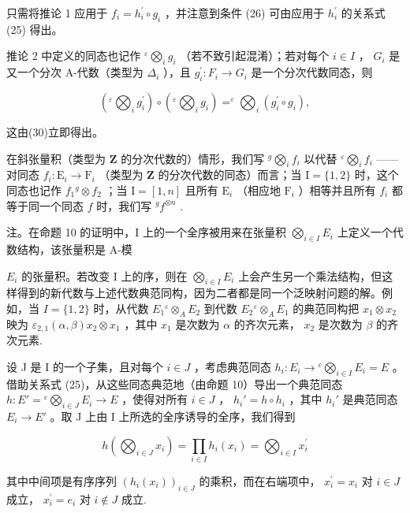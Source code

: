 只需将推论 1 应用于 \(f_{i} = h_{i}^{\prime} \circ g_{i}\) ，并注意到条件 (26) 可由应用于 \(h_{i}^{\prime}\) 的关系式 (25) 得出。

推论 2 中定义的同态也记作 \({}^{\varepsilon}\bigotimes_{i} g_{i}\) （若不致引起混淆）；若对每个 \(i \in I\) ， \(G_{i}\) 是又一个分次 A-代数（类型为 \(\Delta_{i}\) ），且 \(g_{i}^{\prime}: F_{i} \to G_{i}\) 是一个分次代数同态，则

\[
\left(^ {\varepsilon} \bigotimes_ {i} g _ {i} ^ {\prime}\right) \circ \left(^ {\varepsilon} \bigotimes_ {i} g _ {i}\right) = ^ {\varepsilon} \bigotimes_ {i} \left(g _ {i} ^ {\prime} \circ g _ {i}\right),\tag{31}
\]

这由(30)立即得出。

在斜张量积（类型为 \(\mathbf{Z}\) 的分次代数的）情形，我们写 \({}^{g}\bigotimes_{i}f_{i}\) 以代替 \({}^{\varepsilon}\bigotimes_{i}f_{i}\) ——对同态 \(f_{i}: \mathrm{E}_{i} \to \mathrm{F}_{i}\) （类型为 \(\mathbf{Z}\) 的分次代数的同态）而言；当 \(\mathrm{I} = \{1, 2\}\) 时，这个同态也记作 \(f_{1}{}^{g}\otimes f_{2}\) ；当 \(\mathrm{I} = [1, n]\) 且所有 \(\mathrm{E}_{i}\) （相应地 \(\mathrm{F}_{i}\) ）相等并且所有 \(f_{i}\) 都等于同一个同态 \(f\) 时，我们写 \({}^{g}f^{\otimes n}\) .

注。在命题 10 的证明中，I 上的一个全序被用来在张量积 \(\bigotimes_{i\in I}E_i\) 上定义一个代数结构，该张量积是 A-模

\(E_{i}\) 的张量积。若改变 I 上的序，则在 \(\bigotimes_{i\in I}E_{i}\) 上会产生另一个乘法结构，但这样得到的新代数与上述代数典范同构，因为二者都是同一个泛映射问题的解。例如，当 \(I=\{1,2\}\) 时，从代数 \(E_{1}{}^{\varepsilon}\otimes_{A}E_{2}\) 到代数 \(E_{2}{}^{\varepsilon}\otimes_{A}E_{1}\) 的典范同构把 \(x_{1}\otimes x_{2}\) 映为 \(\varepsilon_{2,1}(\alpha,\beta)x_{2}\otimes x_{1}\) ，其中 \(x_{1}\) 是次数为 \(\alpha\) 的齐次元素， \(x_{2}\) 是次数为 \(\beta\) 的齐次元素.

设 J 是 I 的一个子集，且对每个 \(i \in J\) ，考虑典范同态 \(h_{i}: E_{i} \to {}^{\varepsilon}\bigotimes_{i \in I} E_{i} = E\) 。借助关系式 (25)，从这些同态典范地（由命题 10）导出一个典范同态 \(h: E' = {}^{\varepsilon}\bigotimes_{i \in J} E_{i} \to E\) ，使得对所有 \(i \in J\) ， \(h_{i}' = h \circ h_{i}\) ，其中 \(h_{i}'\) 是典范同态 \(E_{i} \to E'\) 。取 J 上由 I 上所选的全序诱导的全序，我们得到

\[
h \left(\bigotimes_ {i \in J} x _ {i}\right) = \prod_ {i \in I} h _ {i} \left(x _ {i}\right) = \bigotimes_ {i \in I} x _ {i} ^ {\prime}
\]

其中中间项是有序序列 \((h_i(x_i))_{i\in J}\) 的乘积，而在右端项中， \(x_{i}^{\prime} = x_{i}\) 对 \(i\in J\) 成立， \(x_{i}^{\prime} = e_{i}\) 对 \(i\notin J\) 成立.

